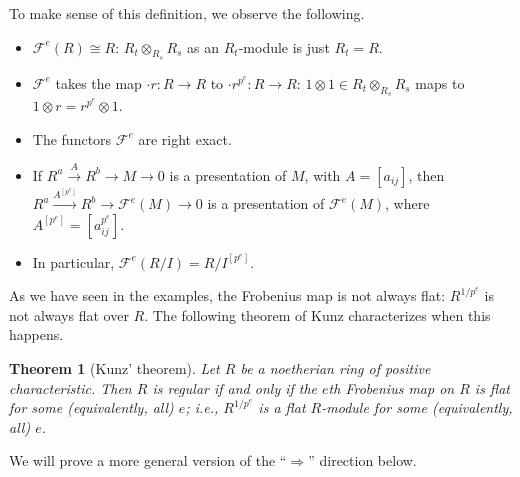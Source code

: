 \documentclass[11pt]{book}
\newtheorem{theorem}{Theorem}[chapter]
\numberwithin{equation}{section}
\numberwithin{theorem}{chapter}
\theoremstyle{definition}
\newtheorem*{basic properties}{Basic Properties}
\newtheorem*{Important Remark}{Important Remark}
\theoremstyle{remark}
\newcommand{\cF}{\mathcal{F}}
\begin{document}
To make sense of this definition, we observe the following.
\begin{itemize}
	\item $\cF^e(R)\cong R$: \quad $R_t \otimes_{R_s} {R_s}$ as an $R_t$-module is just $R_t=R$.
	\item $\cF^e$ takes the map $\cdot r : R \to R$ to $\cdot r^{p^e}: R \to R$: \quad $1\otimes 1\in R_t \otimes_{R_s} {R_s}$ maps to $1 \otimes r = r^{p^e} \otimes 1$.
	\item The functors $\cF^e$ are right exact.
	\item If $R^a \stackrel{A}{\longrightarrow} R^b \to M \to 0$ is a presentation of $M$, with $A=[a_{ij}]$, then $R^a \stackrel{A^{[p^e]}}{\longrightarrow} R^b \to \cF^e(M) \to 0$ is a presentation of $\cF^e(M)$, where $A^{[p^e]}=[a^{p^e}_{ij}]$.
	\item In particular, $\cF^e(R/I)=R/I^{[p^e]}$.
\end{itemize}

As we have seen in the examples, the Frobenius map is not always flat: $R^{1/p^e}$ is not always flat over $R$. The following theorem of Kunz characterizes when this happens.

\begin{theorem}[Kunz' theorem]
	Let $R$ be a noetherian ring of positive characteristic. Then $R$ is regular if and only if the $e$th Frobenius map on $R$ is flat for some (equivalently, all) $e$; i.e., $R^{1/p^e}$ is a flat $R$-module for  some (equivalently, all) $e$.
\end{theorem}

We will prove a more general version of the ``$\Rightarrow$'' direction below.
\end{document}
